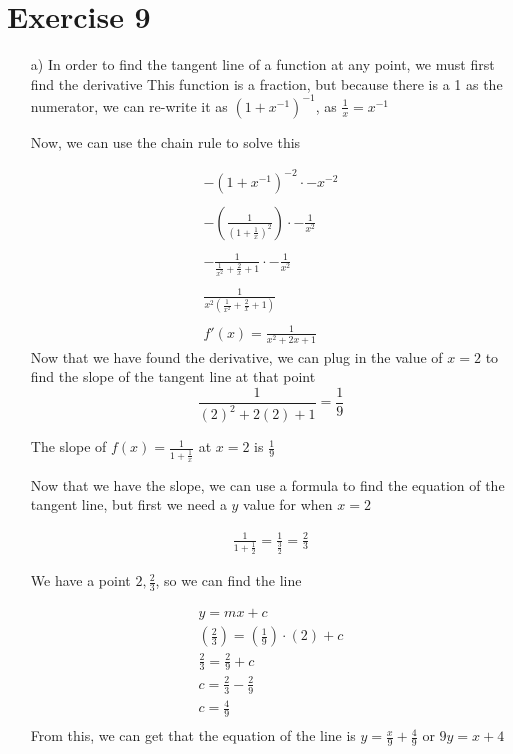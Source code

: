 \documentclass[11pt]{article}
\begin{document}
\section*{Exercise 9}
\begin{enumerate}
  \item[a)]
        In order to find the tangent line of a function at any point, we must first find the derivative
        This function is a fraction, but because there is a 1 as the numerator, we can re-write it as $(1+x^{-1})^{-1}$, as $\frac{1}{x} = x^{-1}$

        Now, we can use the chain rule to solve this


\begin{gather*}
  -(1+x^{-1})^{-2} \cdot -x^{-2} \\
  \\
  -\left(\frac{1}{(1+\frac{1}{x})^{2}}\right) \cdot -\frac{1}{x^{2}}\\
  \\
  -\frac{1}{\frac{1}{x^{2}}+\frac{2}{x}+1} \cdot  - \frac{1}{x^{2}} \\
  \\
  \frac{1}{x^{2}(\frac{1}{x^{2}}+\frac{2}{x}+1)} \\
  \\
  f'(x) = \frac{1}{x^{2}+2x+1}
\end{gather*}
        Now that we have found the derivative, we can plug in the value of $x = 2$ to find the slope of the tangent line at that point
        \[
            \frac{1}{(2)^{2}+2(2)+1} = \frac{1}{9}
        \]

        The slope of $f(x) = \frac{1}{1+\frac{1}{x}}$ at $x = 2$ is $\frac{1}{9}$

        Now that we have the slope, we can use a formula to find the equation of the tangent line, but first we need a $y$ value for when $x = 2$


\begin{gather*}
\frac{1}{1+\frac{1}{2}} = \frac{1}{\frac{3}{2}} = \frac{2}{3}
\end{gather*}

        We have a point $2,\frac{2}{3}$, so we can find the line

\begin{gather*}
  y = mx+c \\
  \left(\frac{2}{3}\right) = \left(\frac{1}{9}\right) \cdot \left( 2 \right) + c \\
  \frac{2}{3} = \frac{2}{9} + c \\
  c = \frac{2}{3} - \frac{2}{9} \\
  c = \frac{4}{9} \\
\end{gather*}
        From this, we can get that the equation of the line is $y = \frac{x}{9} + \frac{4}{9}$ or $9y = x+4$


\end{enumerate}
\end{document}
